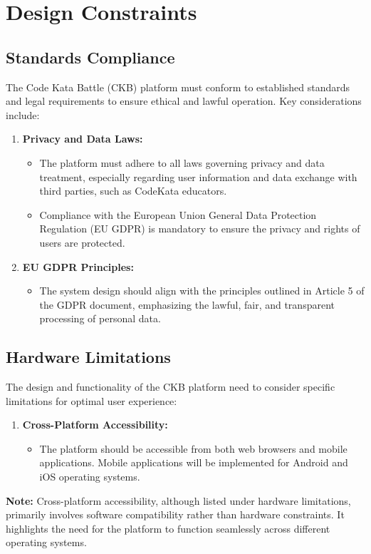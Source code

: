 \section{Design Constraints}
\label{sec:design_constraints}%

\subsection{Standards Compliance}
\label{subsec:standards_compliance}%
The Code Kata Battle (CKB) platform must conform to established standards and legal requirements to ensure ethical and lawful operation. Key considerations include:

\begin{enumerate}
    \item \textbf{Privacy and Data Laws:}
          \begin{itemize}
              \item The platform must adhere to all laws governing privacy and data treatment, especially regarding user information and data exchange with third parties, such as CodeKata educators.
              \item Compliance with the European Union General Data Protection Regulation (EU GDPR) is mandatory to ensure the privacy and rights of users are protected.
          \end{itemize}

    \item \textbf{EU GDPR Principles:}
          \begin{itemize}
              \item The system design should align with the principles outlined in Article 5 of the GDPR document, emphasizing the lawful, fair, and transparent processing of personal data.
          \end{itemize}
\end{enumerate}

\subsection{Hardware Limitations}
\label{subsec:hardware_limitations}%
The design and functionality of the CKB platform need to consider specific limitations for optimal user experience:

\begin{enumerate}
    \item \textbf{Cross-Platform Accessibility:}
          \begin{itemize}
              \item The platform should be accessible from both web browsers and mobile applications. Mobile applications will be implemented for Android and iOS operating systems.
          \end{itemize}
\end{enumerate}
\textbf{Note:} Cross-platform accessibility, although listed under hardware limitations, primarily involves software compatibility rather than hardware constraints. It highlights the need for the platform to function seamlessly across different operating systems.

